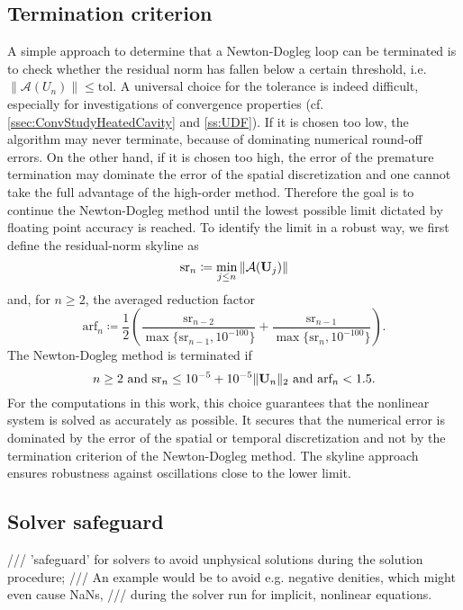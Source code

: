 \subsection{Termination criterion}
\label{ssec:TerminationCriterion}
A simple approach to determine that a Newton-Dogleg loop can be terminated
is to check whether the residual norm has fallen below a certain threshold, i.e.
$ \| \mathcal{A}(U_n) \| \leq \textrm{tol}  $.
A universal choice for the tolerance is indeed difficult,
especially for investigations of convergence properties (cf.  \cref{ssec:ConvStudyHeatedCavity} and \cref{ss:UDF}).
If it is chosen too low, the algorithm may never terminate, because of dominating numerical round-off errors. On the other hand, if it is chosen too high, the error of the premature termination may dominate  the error of
the spatial discretization and one cannot take the full advantage of the high-order method.
Therefore the goal is to continue the Newton-Dogleg method until
the lowest possible limit dictated by floating point accuracy is reached.
To identify the limit in a robust way, we first define the residual-norm skyline as
\begin{equation}
	\textrm{sr}_n \coloneqq \min_{j \leq n} \| \mathcal{A}(\textbf{U}_j) \|
\end{equation}
and, for $n \geq 2$, the averaged reduction factor
\begin{equation}
	\textrm{arf}_n \coloneqq \frac{1}{2} \left(
	\frac{ \textrm{sr}_{n-2} }{  \max \{ \textrm{sr}_{n-1}, 10^{-100} \} }
	+  \frac{ \textrm{sr}_{n-1} }{  \max \{ \textrm{sr}_{n},   10^{-100} \} }
	\right) .
\end{equation}
The Newton-Dogleg method is terminated if
\begin{equation}
	n \geq 2 \text{ and }
	\textrm{sr}_n \leq 10^{-5} + 10^{-5} \| \textbf{U}_n \|_2 \text{ and }
	\textrm{arf}_n < 1.5 .
\end{equation}
For the computations in this work, this choice guarantees that the
nonlinear system is solved as accurately as possible. It secures that the numerical error is dominated by the error of the spatial or temporal discretization
and not by the termination criterion of the Newton-Dogleg method.
The skyline approach ensures robustness against oscillations close to the lower limit.
\subsection{Solver safeguard}
/// 'safeguard' for solvers to avoid unphysical solutions during the solution procedure;
/// An example would be to avoid e.g. negative denities, which might even cause NaNs,
/// during the solver run for implicit, nonlinear equations.
